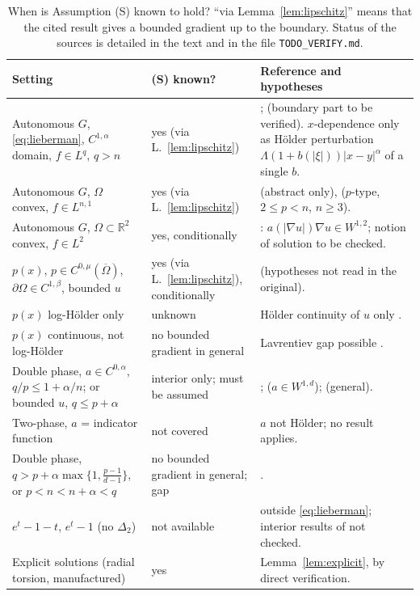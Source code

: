\documentclass[11pt]{amsart}
\theoremstyle{definition}
\theoremstyle{remark}
\numberwithin{equation}{section}
\newcommand{\R}{\mathbb{R}}
\newcommand{\abs}[1]{\lvert #1\rvert}
\begin{document}
\begin{table}[t]
\caption{When is Assumption (S) known to hold? ``via Lemma~\ref{lem:lipschitz}'' means that the cited result gives a bounded gradient up to the boundary. Status of the sources is detailed in the text and in the file \texttt{TODO\_VERIFY.md}.}\label{tab:S}
\small
\begin{tabular}{@{}>{\raggedright\arraybackslash}p{4.6cm}>{\raggedright\arraybackslash}p{2.2cm}>{\raggedright\arraybackslash}p{7.4cm}@{}}
\toprule
Setting & (S) known? & Reference and hypotheses\\
\midrule
Autonomous $G$, \eqref{eq:lieberman}, $C^{1,\alpha}$ domain, $f\in L^q$, $q>n$ & yes (via L.~\ref{lem:lipschitz}) & \cite[Cor.~1.4]{Antonini2026}; \cite[Thm.~1.7]{Lieberman1991} (boundary part to be verified). $x$-dependence only as H\"older perturbation $\Lambda(1+b(\abs\xi))\abs{x-y}^\alpha$ of a single $b$.\\
Autonomous $G$, $\Omega$ convex, $f\in L^{n,1}$ & yes (via L.~\ref{lem:lipschitz}) & \cite{CianchiMazya2011} (abstract only), \cite[Thm.~3.5]{CianchiMazya2014JEMS} ($p$-type, $2\le p<n$, $n\ge3$).\\
Autonomous $G$, $\Omega\subset\R^2$ convex, $f\in L^2$ & yes, conditionally & \cite[Thm.~2.3]{CianchiMazya2018}: $a(\abs{\nabla u})\nabla u\in W^{1,2}$; notion of solution to be checked.\\
$p(x)$, $p\in C^{0,\mu}(\overline\Omega)$, $\partial\Omega\in C^{1,\beta}$, bounded $u$ & yes (via L.~\ref{lem:lipschitz}), conditionally & \cite{Fan2007} (hypotheses not read in the original).\\
$p(x)$ log-H\"older only & unknown & H\"older continuity of $u$ only \cite{AcerbiMingione2001}.\\
$p(x)$ continuous, not log-H\"older & no bounded gradient in general & Lavrentiev gap possible \cite[Thm.~30]{BDS2020}.\\
Double phase, $a\in C^{0,\alpha}$, $q/p\le1+\alpha/n$; or bounded $u$, $q\le p+\alpha$ & interior only; must be assumed & \cite{ColomboMingione2015a,ColomboMingione2015b,BaroniColomboMingione2018}; \cite{DeFilippisMingione2021} ($a\in W^{1,d}$); \cite{HastoOk2022} (general).\\
Two-phase, $a$ = indicator function & not covered & $a$ not H\"older; no result applies.\\
Double phase, $q>p+\alpha\max\{1,\frac{p-1}{d-1}\}$, or $p<n<n+\alpha<q$ & no bounded gradient in general; gap & \cite{BDS2020,ELM2004,FMM2004,Zhikov1995}.\\
$e^t-1-t$, $e^t-1$ (no $\Delta_2$) & not available & outside \eqref{eq:lieberman}; interior results of \cite{DeFilippisMingione2021} not checked.\\
Explicit solutions (radial torsion, manufactured) & yes & Lemma~\ref{lem:explicit}, by direct verification.\\
\bottomrule
\end{tabular}
\end{table}
\end{document}
